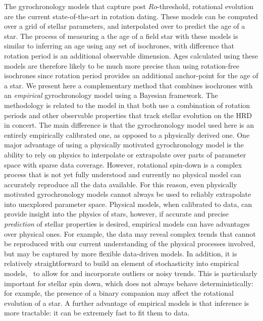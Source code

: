 The gyrochronology models that capture post $Ro$-threshold, rotational
evolution \citep{vansaders2016} are the current state-of-the-art in rotation
dating.
These models can be computed over a grid of stellar parameters, and
interpolated over to predict the age of a star.
The process of measuring a the age of a field star with these models is
similar to inferring an age using any set of isochrones, with difference that
rotation period is an additional observable dimension.
Ages calculated using these models are therefore likely to be much more
precise than using rotation-free isochrones since rotation period provides an
additional anchor-point for the age of a star.
We present here a complementary method that combines isochrones with an {\it
empirical} gyrochronology model using a Bayesian framework.
The methodology is related to the \citet{vansaders2016} model in that both use
a combination of rotation periods and other observable properties that track
stellar evolution on the HRD in concert.
The main difference is that the gyrochronology model used here is an entirely
empirically calibrated one, as opposed to a physically derived one.
One major advantage of using a physically motivated gyrochronology model is
the ability to rely on physics to interpolate or extrapolate over parts of
parameter space with sparse data coverage.
However, rotational spin-down is a complex process that is not yet fully
understood and currently no physical model can accurately reproduce all the
data available.
For this reason, even physically motivated gyrochronology models cannot always
be used to reliably extrapolate into unexplored parameter space.
Physical models, when calibrated to data, can provide insight into the physics
of stars, however, if accurate and precise {\it prediction} of stellar
properties is desired, empirical models can have advantages over physical
ones.
For example, the data may reveal complex trends that cannot be reproduced with
our current understanding of the physical processes involved, but may be
captured by more flexible data-driven models.
In addition, it is relatively straightforward to build an element of
stochasticity into empirical models, \ie\ to allow for and incorporate
outliers or noisy trends.
This is particularly important for stellar spin down, which does not always
behave deterministically: for example, the presence of a binary companion may
affect the rotational evolution of a star.
A further advantage of empirical models is that inference is more tractable:
it can be extremely fast to fit them to data.

